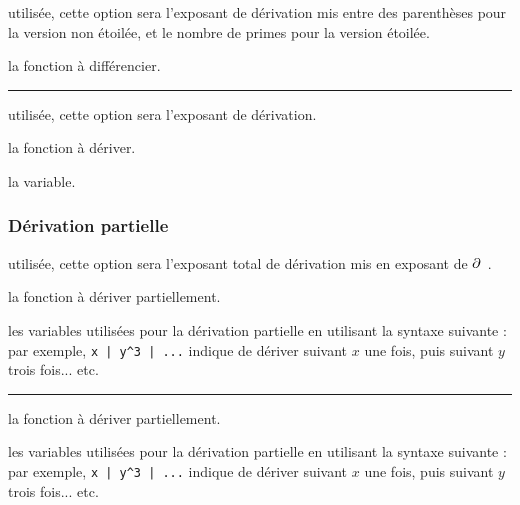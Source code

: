 \documentclass[12pt,a4paper]{article}
\theoremstyle{definition}
\newcommand\separation{
	\medskip
	\hfill\rule{0.5\textwidth}{0.75pt}\hfill
	\medskip
}
\newcommand\extraspace{
	\vspace{0.25em}
}
\begin{document}


\extraspace



\extraspace



\IDoption{} utilisée, cette option sera l'exposant de dérivation mis entre des parenthèses pour la version non étoilée, et le nombre de primes pour la version étoilée.

\IDarg{} la fonction à différencier.


\separation





\IDoption{} utilisée, cette option sera l'exposant de dérivation.

 la fonction à dériver.

 la variable.





\subsubsection{Dérivation partielle}




\IDoption{} utilisée, cette option sera l'exposant total de dérivation mis en exposant de $\pp$.

 la fonction à dériver partiellement.

 les variables utilisées pour la dérivation partielle en utilisant la syntaxe suivante : par exemple, \verb+x | y^3 | ...+ indique de dériver suivant $x$ une fois, puis suivant $y$ trois fois... etc.


\separation




 la fonction à dériver partiellement.

 les variables utilisées pour la dérivation partielle en utilisant la syntaxe suivante : par exemple, \verb+x | y^3 | ...+ indique de dériver suivant $x$ une fois, puis suivant $y$ trois fois... etc.
\end{document}
